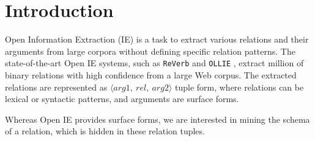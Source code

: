 \section{Introduction}

Open Information Extraction (IE) is a task to extract various relations and their
arguments from large corpora without defining specific relation patterns.
The state-of-the-art Open IE systems, such as {\tt ReVerb} \cite{fader2011identifying} and
{\tt OLLIE} \cite{schmitz2012open}, extract million of binary relations with high confidence from a large Web corpus.
The extracted relations are represented as $\langle arg1,\ rel,\ arg2 \rangle$ tuple form, where relations
can be lexical or syntactic patterns, and arguments are surface forms.

Whereas Open IE provides surface forms, we are interested in mining the schema of a relation, which
is hidden in these relation tuples.




